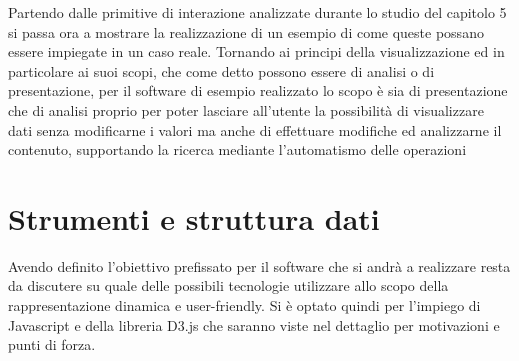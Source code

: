 \large{
Partendo dalle primitive di interazione analizzate durante lo studio del capitolo 5 si passa ora a mostrare la realizzazione di un esempio di come queste possano essere impiegate in un caso reale. Tornando ai principi della visualizzazione ed in particolare ai suoi scopi, che come detto possono essere di analisi o di presentazione, per il software di esempio realizzato lo scopo è sia di presentazione che di analisi proprio per poter lasciare all'utente la possibilità di visualizzare dati senza modificarne i valori ma anche di effettuare modifiche ed analizzarne il contenuto, supportando la ricerca mediante l'automatismo delle operazioni
\section{Strumenti e struttura dati}
Avendo definito l'obiettivo prefissato per il software che si andrà a realizzare resta da discutere su quale delle possibili tecnologie utilizzare allo scopo della rappresentazione dinamica e user-friendly.
Si è optato quindi per l'impiego di Javascript e della libreria D3.js che saranno viste nel dettaglio per motivazioni e punti di forza.
}
